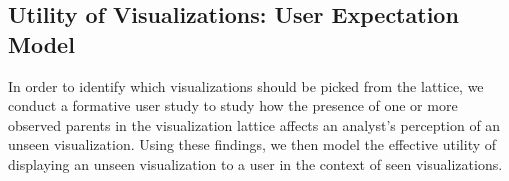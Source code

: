 
\subsection{Utility of Visualizations: User Expectation Model\label{sec:utility}}
In order to identify which visualizations should be picked from the lattice, we conduct a formative user study
to study how the presence of one or more observed parents in the visualization lattice affects an analyst's perception of an unseen visualization. Using these findings, we then model the effective utility of displaying an unseen visualization to a user in the context of seen visualizations.%

